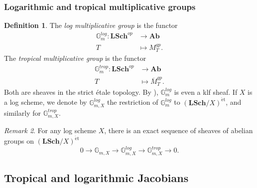 \documentclass[a4paper,11pt]{amsart} %
\numberwithin{equation}{subsection}
\newcommand{\bb}[1]{{\mathbb{#1}}}
\newcommand{\ca}[1]{{\mathcal{#1}}}
\newcommand{\bd}[1]{{\mathbf{#1}}}
\newcommand{\ul}[1]{{\underline{#1}}}
\newcommand{\cat}[1]{\bd{#1}}
\def\et{\mathrm{\acute{e}t}}
\def\o#1{\overline{#1}}
\theoremstyle{definition}
\newtheorem{definition}{Definition}[section]
\theoremstyle{plain}%
\theoremstyle{remark}
\newtheorem{remark}[definition]{Remark}
\begin{document}


\subsubsection{Logarithmic and tropical multiplicative groups}

\begin{definition}
    The \emph{log multiplicative group} is the functor
    \begin{align*}
        \bb G_m^{log} \colon \cat{LSch}^{op} & \to \cat{Ab} \\
        T & \mapsto M_T^{gp}.
    \end{align*}
    The \emph{tropical multiplicative group} is the functor
    \begin{align*}
        \bb G_m^{trop} \colon \cat{LSch}^{op} & \to \cat{Ab} \\
        T & \mapsto \o M_T^{gp}.
    \end{align*}
    Both are sheaves in the strict \'etale topology. By \cite[Theorem 3.2]{katoLogStructuresII}), $\bb G_m^{log}$ is even a klf sheaf. If $X$ is a log scheme, we denote by $\bb G_{m,X}^{log}$ the restriction of $\bb G_m^{log}$ to $(\cat{LSch}/X)^{\et}$, and similarly for $\bb G_{m,X}^{trop}$.
\end{definition}

\begin{remark}
    For any log scheme $X$, there is an exact sequence of sheaves of abelian groups on $(\cat{LSch}/X)^{\et}$
    \begin{equation}\label{eqn:fundamental_exact_seq}
        0 \to \bb G_{m,X} \to \bb G_{m,X}^{log} \to \bb G_{m,X}^{trop} \to 0.
    \end{equation}
\end{remark}

\subsection{Tropical and logarithmic Jacobians}\label{section:trop_log_jacobians}
\end{document}
